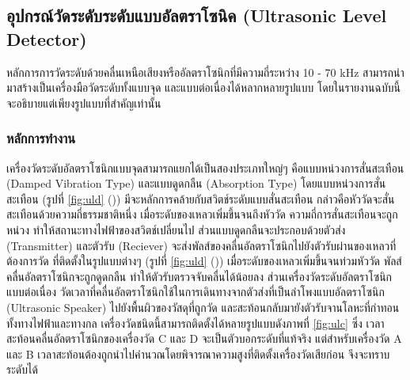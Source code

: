 \documentclass[final,11pt]{article}
\begin{document}
\subsection{อุปกรณ์วัดระดับระดับแบบอัลตราโซนิค (Ultrasonic Level Detector)}
หลักการการวัดระดับด้วยคลื่นเหนือเสียงหรืออัลตราโซนิกที่มีความถี่ระหว่าง 10 - 70 kHz สามารถนำมาสร้างเป็นเครื่องมือวัดระดับทั้งแบบจุด 
และแบบต่อเนื่องได้หลากหลายรูปแบบ โดยในรายงานฉบับนี้จะอธิบายแต่เพียงรูปแบบที่สำคัญเท่านั้น
\subsubsection{หลักการทำงาน}
เครื่องวัดระดับอัลตราโซนิกแบบจุดสามารถแยกได้เป็นสองประเภทใหญ่ๆ คือแบบหน่วงการสั่นสะเทือน (Damped Vibration Type)
และแบบดูดกลืน (Absorption Type) โดยแบบหน่วงการสั่นสะเทือน (รูปที่ \ref{fig:uld} ()) มีจะหลักการคล้ายกับสวิตช์ระดับแบบสั่นสะเทือน 
กล่าวคือหัววัดจะสั่นสะเทือนด้วยความถี่ธรรมชาติหนึ่ง เมื่อระดับของเหลวเพิ่มขึ้นจนถึงหัววัด ความถี่การสั่นสะเทือนจะถูกหน่วง ทำให้สถานะทางไฟฟ้าของสวิตช์เปลี่ยนไป 
ส่วนแบบดูดกลืนจะประกอบด้วยตัวส่ง (Transmitter) และตัวรับ (Reciever) จะส่งพัลส์ของคลื่นอัลตราโซนิกไปยังตัวรับผ่านของเหลวที่ต้องการวัด 
ที่ติดตั้งในรูปแบบต่างๆ (รูปที่ \ref{fig:uld} ()) เมื่อระดับของเหลวเพิ่มขึ้นจนท่วมหัววัด พัลส์คลื่นอัลตราโซนิกจะถูกดูดกลืน ทำให้ตัวรับตรวจจับคลื่นได้น้อยลง 
ส่วนเครื่องวัดระดับอัลตราโซนิกแบบต่อเนื่อง วัดเวลาที่คลื่นอัลตราโซนิกใช้ในการเดินทางจากตัวส่งที่เป็นลำโพงแบบอัลตราโซนิก (Ultrasonic Speaker)
ไปยังพื้นผิวของวัสดุที่ถูกวัด และสะท้อนกลับมายังตัวรับจานโลหะที่กำทอนทั้งทางไฟฟ้าและทางกล เครื่องวัดชนิดนี้สามารถติดตั้งได้หลายรูปแบบดังภาพที่ \ref{fig:ulc} ซึ่ง
เวลาสะท้อนคลื่นอัลตราโซนิกของเครื่องวัด C และ D จะเป็นตัวบอกระดับที่แท้จริง แต่สำหรับเครื่องวัด A และ B 
เวลาสะท้อนต้องถูกนำไปคำนวณโดยพิจารณาความสูงที่ติดตั้งเครื่องวัดเสียก่อน จึงจะทราบระดับได้
\end{document}
